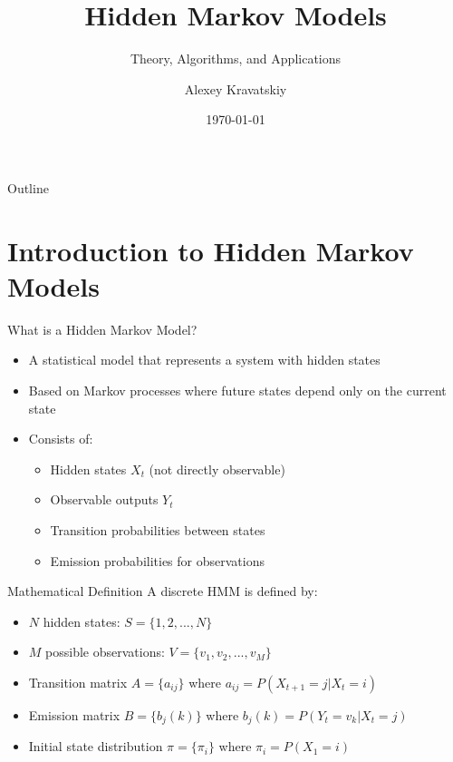 \documentclass{beamer}
\title{Hidden Markov Models}
\subtitle{Theory, Algorithms, and Applications}
\author{Alexey Kravatskiy}
\date{\today}
\begin{document}
\begin{frame}
    \titlepage
\end{frame}


\begin{frame}{Outline}
    \tableofcontents
\end{frame}
\section{Introduction to Hidden Markov Models}

\begin{frame}{What is a Hidden Markov Model?}
    \begin{itemize}
        \item A statistical model that represents a system with hidden states
        \item Based on Markov processes where future states depend only on the current state
        \item Consists of:
        \begin{itemize}
            \item Hidden states $X_t$ (not directly observable)
            \item Observable outputs $Y_t$
            \item Transition probabilities between states
            \item Emission probabilities for observations
        \end{itemize}
    \end{itemize}
\end{frame}
\begin{frame}{Mathematical Definition}
    A discrete HMM is defined by:
    \begin{itemize}
        \item $N$ hidden states: $S = \{1, 2, ..., N\}$
        \item $M$ possible observations: $V = \{v_1, v_2, ..., v_M\}$
        \item Transition matrix $A = \{a_{ij}\}$ where $a_{ij} = P(X_{t+1} = j | X_t = i)$
        \item Emission matrix $B = \{b_j(k)\}$ where $b_j(k) = P(Y_t = v_k | X_t = j)$
        \item Initial state distribution $\pi = \{\pi_i\}$ where $\pi_i = P(X_1 = i)$
    \end{itemize}
\end{frame}
\end{document}
